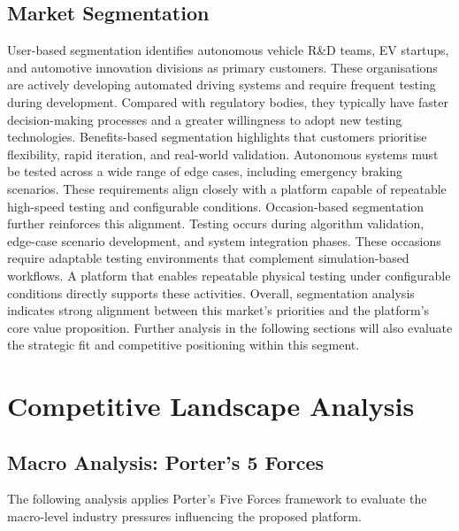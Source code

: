 \subsection{Market Segmentation}

User-based segmentation identifies autonomous vehicle R\&D teams, EV startups, and automotive innovation divisions as primary customers. These organisations are actively developing automated driving systems and require frequent testing during development. Compared with regulatory bodies, they typically have faster decision-making processes and a greater willingness to adopt new testing technologies.
Benefits-based segmentation highlights that customers prioritise flexibility, rapid iteration, and real-world validation. Autonomous systems must be tested across a wide range of edge cases, including emergency braking scenarios. These requirements align closely with a platform capable of repeatable high-speed testing and configurable conditions.
Occasion-based segmentation further reinforces this alignment. Testing occurs during algorithm validation, edge-case scenario development, and system integration phases. These occasions require adaptable testing environments that complement simulation-based workflows. A platform that enables repeatable physical testing under configurable conditions directly supports these activities.
Overall, segmentation analysis indicates strong alignment between this market’s priorities and the platform’s core value proposition. Further analysis in the following sections will also evaluate the strategic fit and competitive positioning within this segment.

\section{Competitive Landscape Analysis}
\label{sec:competitive_landscape}

\subsection{Macro Analysis: Porter's 5 Forces}

The following analysis applies Porter’s Five Forces framework to evaluate the macro-level industry pressures influencing the proposed platform.

